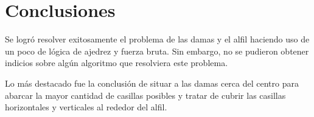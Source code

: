 \documentclass[12pt]{article}
\begin{document}
\section{Conclusiones}

Se logró resolver exitosamente el problema de las damas y el alfil haciendo uso de un poco de lógica de ajedrez y fuerza bruta. Sin embargo, no se pudieron obtener indicios sobre algún algoritmo que resolviera este problema.

Lo más destacado fue la conclusión de situar a las damas cerca del centro para abarcar la mayor cantidad de casillas posibles y tratar de cubrir las casillas horizontales y verticales al rededor del alfil.
\end{document}
